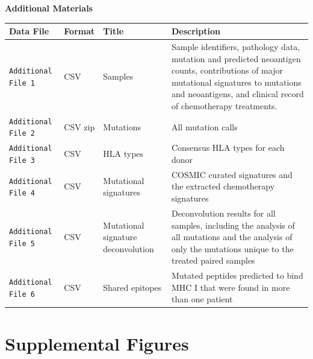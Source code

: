 
\pagebreak
\begin{center}
\textbf{\large Additional Materials}
\end{center}

\setcounter{equation}{0}
\setcounter{figure}{0}
\setcounter{table}{0}
\makeatletter
\renewcommand{\theequation}{S\arabic{equation}}
\renewcommand{\thefigure}{S\arabic{figure}}

\begin{center}
    \begin{tabular}{ | l | l | l | p{8cm} |}
    \hline
    Data File & Format & Title & Description \\ \hline
    \texttt{Additional File 1} & CSV & Samples & Sample identifiers, pathology data, mutation and predicted neoantigen counts, contributions of major mutational signatures to mutations and neoantigens, and clinical record of chemotherapy treatments. \\ \hline

    \texttt{Additional File 2} & CSV zip & Mutations & All mutation calls \\ \hline
    
    \texttt{Additional File 3} & CSV & HLA types & Consensus HLA types for each donor \\ \hline
    
    \texttt{Additional File 4} & CSV & Mutational signatures & COSMIC curated signatures and the extracted chemotherapy signatures \\ \hline

    \texttt{Additional File 5} & CSV & Mutational signature deconvolution & Deconvolution results for all samples, including the analysis of all mutations and the analysis of only the mutations unique to the treated paired samples  \\ \hline
    
    \texttt{Additional File 6} & CSV & Shared epitopes & Mutated peptides predicted to bind MHC I that were found in more than one patient  \\ \hline

    \end{tabular}
\end{center}


\section*{Supplemental Figures}

